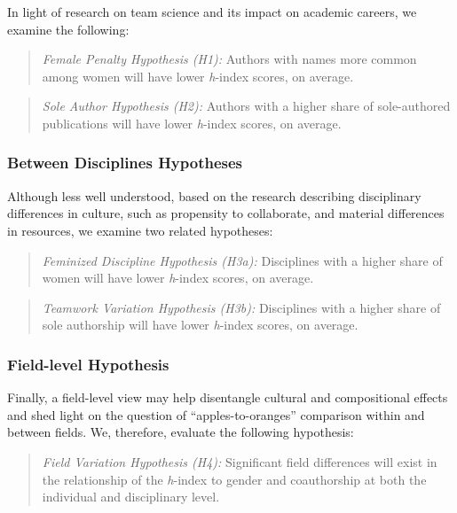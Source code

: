 \documentclass[
  10pt,
  letterpaper,
]{article}
\begin{document}
In light of research on team science and its impact on academic careers,
we examine the following:

\begin{quote}
\emph{Female Penalty Hypothesis (H1):} Authors with names more common
among women will have lower \emph{h}-index scores, on average.
\end{quote}

\begin{quote}
\emph{Sole Author Hypothesis (H2):} Authors with a higher share of
sole-authored publications will have lower \emph{h}-index scores, on
average.
\end{quote}

\subsubsection{Between Disciplines
Hypotheses}\label{between-disciplines-hypotheses}

Although less well understood, based on the research describing
disciplinary differences in culture, such as propensity to collaborate,
and material differences in resources, we examine two related
hypotheses:

\begin{quote}
\emph{Feminized Discipline Hypothesis (H3a):} Disciplines with a higher
share of women will have lower \emph{h}-index scores, on average.
\end{quote}

\begin{quote}
\emph{Teamwork Variation Hypothesis (H3b):} Disciplines with a higher
share of sole authorship will have lower \emph{h}-index scores, on
average.
\end{quote}

\subsubsection{Field-level Hypothesis}\label{field-level-hypothesis}

Finally, a field-level view may help disentangle cultural and
compositional effects and shed light on the question of
``apples-to-oranges'' comparison within and between fields. We,
therefore, evaluate the following hypothesis:

\begin{quote}
\emph{Field Variation Hypothesis (H4):} Significant field differences
will exist in the relationship of the \emph{h}-index to gender and
coauthorship at both the individual and disciplinary level.
\end{quote}
\end{document}
